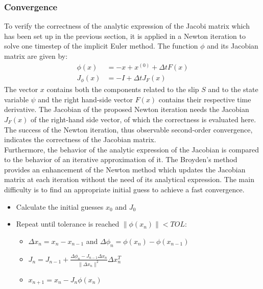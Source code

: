 \subsubsection{Convergence}
To verify the correctness of the analytic expression of the Jacobi matrix which has been set up in the previous section, it is applied in a Newton iteration to solve one timestep of the implicit Euler method. The function $\phi$ and its Jacobian matrix are given by: 
\begin{align}
\phi(x) &= -x + x^{(0)} + \Delta t F(x) \\
J_\phi(x) &= -I + \Delta t J_F(x)
\end{align}
The vector $x$ contains both the components related to the slip $S$ and to the state variable $\psi$ and the right hand-side vector $F(x)$ contains their respective time derivative. The Jacobian of the proposed Newton iteration needs the Jacobian $J_F(x)$ of the right-hand side vector, of which the correctness is evaluated here. The success of the Newton iteration, thus observable second-order convergence, indicates the correctness of the Jacobian matrix. \\
Furthermore, the behavior of the analytic expression of the Jacobian is compared to the behavior of an iterative approximation of it. The Broyden's method \cite{BroydenIteration} provides an enhancement of the Newton method which updates the Jacobian matrix at each iteration without the need of its analytical expression. The main difficulty is to find an appropriate initial guess to achieve a fast convergence. 

\begin{itemize}
	\item Calculate the initial guesses $x_0$ and $J_0$
	\item Repeat until tolerance is reached $\|\phi(x_n)\| < TOL$: 
	\begin{itemize}
		\item $\Delta x_n = x_n - x_{n-1}$ and $\Delta \phi_n = \phi(x_n) - \phi(x_{n-1})$ 
		\item $J_n = J_{n-1} + \frac{\Delta \phi_n - J_{n-1}\Delta x_n}{\|\Delta x_n\|^2} \Delta x_n^T$
		\item $x_{n+1} = x_n - J_n \phi(x_n)$
	\end{itemize} 
\end{itemize}

